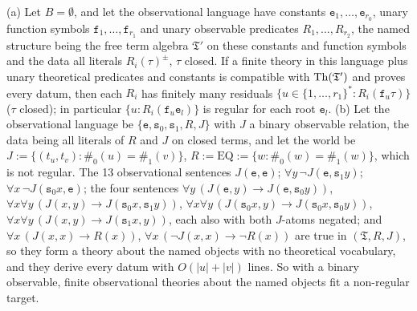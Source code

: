 \begin{proposition}\label{prop:terms:binaryobs}
(a) Let $B=\emptyset$, and let the observational language have constants $\mathtt e_1,\dots,\mathtt e_{r_0}$, unary function symbols $\mathtt f_1,\dots,\mathtt f_{r_1}$ and unary observable predicates $R_1,\dots,R_{r_2}$, the named structure being the free term algebra $\mathfrak T'$ on these constants and function symbols and the data all literals $R_i(\tau)^{\pm}$, $\tau$ closed. If a finite theory in this language plus unary theoretical predicates and constants is compatible with $\mathrm{Th}(\mathfrak T')$ and proves every datum, then each $R_i$ has finitely many residuals $\{u\in\{1,\dots,r_1\}^*:R_i(\mathtt f_u\tau)\}$ ($\tau$ closed); in particular $\{u:R_i(\mathtt f_u\mathtt e_l)\}$ is regular for each root $\mathtt e_l$.
(b) Let the observational language be $\{\mathtt e,\mathtt s_0,\mathtt s_1,R,J\}$ with $J$ a binary observable relation, the data being all literals of $R$ and $J$ on closed terms, and let the world be $J:=\{(t_u,t_v):\#_0(u)=\#_1(v)\}$, $R:=\mathrm{EQ}:=\{w:\#_0(w)=\#_1(w)\}$, which is not regular. The 13 observational sentences
$J(\mathtt e,\mathtt e)$; $\forall y\,\neg J(\mathtt e,\mathtt s_1y)$; $\forall x\,\neg J(\mathtt s_0x,\mathtt e)$; the four sentences $\forall y\,(J(\mathtt e,y)\to J(\mathtt e,\mathtt s_0y))$, $\forall x\forall y\,(J(x,y)\to J(\mathtt s_0x,\mathtt s_1y))$, $\forall x\forall y\,(J(\mathtt s_0x,y)\to J(\mathtt s_0x,\mathtt s_0y))$, $\forall x\forall y\,(J(x,y)\to J(\mathtt s_1x,y))$, each also with both $J$-atoms negated; and $\forall x\,(J(x,x)\to R(x))$, $\forall x\,(\neg J(x,x)\to\neg R(x))$
are true in $(\mathfrak T,R,J)$, so they form a theory about the named objects with no theoretical vocabulary, and they derive every datum with $O(\lvert u\rvert+\lvert v\rvert)$ lines. So with a binary observable, finite observational theories about the named objects fit a non-regular target.
\end{proposition}

